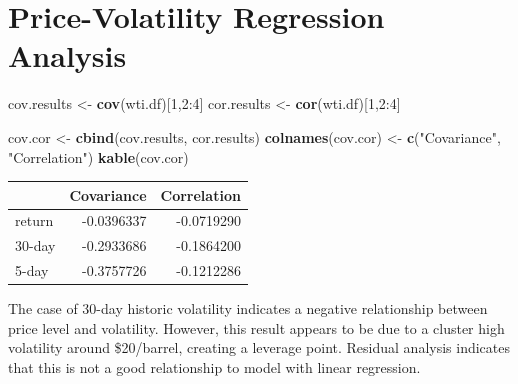 \documentclass[11pt,]{article}
\newenvironment{Shaded}{\begin{snugshade}}{\end{snugshade}}
\newcommand{\KeywordTok}[1]{\textcolor[rgb]{0.13,0.29,0.53}{\textbf{{#1}}}}
\newcommand{\DataTypeTok}[1]{\textcolor[rgb]{0.13,0.29,0.53}{{#1}}}
\newcommand{\DecValTok}[1]{\textcolor[rgb]{0.00,0.00,0.81}{{#1}}}
\newcommand{\StringTok}[1]{\textcolor[rgb]{0.31,0.60,0.02}{{#1}}}
\newcommand{\NormalTok}[1]{{#1}}
\begin{document}
\section{Price-Volatility Regression
Analysis}\label{price-volatility-regression-analysis}

\begin{Shaded}
\begin{Highlighting}[]
\NormalTok{cov.results <-}\StringTok{ }\KeywordTok{cov}\NormalTok{(wti.df)[}\DecValTok{1}\NormalTok{,}\DecValTok{2}\NormalTok{:}\DecValTok{4}\NormalTok{]}
\NormalTok{cor.results <-}\StringTok{ }\KeywordTok{cor}\NormalTok{(wti.df)[}\DecValTok{1}\NormalTok{,}\DecValTok{2}\NormalTok{:}\DecValTok{4}\NormalTok{]}

\NormalTok{cov.cor <-}\StringTok{ }\KeywordTok{cbind}\NormalTok{(cov.results, cor.results)}
\KeywordTok{colnames}\NormalTok{(cov.cor) <-}\StringTok{ }\KeywordTok{c}\NormalTok{(}\StringTok{"Covariance"}\NormalTok{, }\StringTok{"Correlation"}\NormalTok{)}
\KeywordTok{kable}\NormalTok{(cov.cor)}
\end{Highlighting}
\end{Shaded}

\begin{longtable}[]{@{}lrr@{}}
\toprule
& Covariance & Correlation\tabularnewline
\midrule
\endhead
return & -0.0396337 & -0.0719290\tabularnewline
30-day & -0.2933686 & -0.1864200\tabularnewline
5-day & -0.3757726 & -0.1212286\tabularnewline
\bottomrule
\end{longtable}

The case of 30-day historic volatility indicates a negative relationship
between price level and volatility. However, this result appears to be
due to a cluster high volatility around \$20/barrel, creating a leverage
point. Residual analysis indicates that this is not a good relationship
to model with linear regression.

\begin{Shaded}
\end{Shaded}
\end{document}
